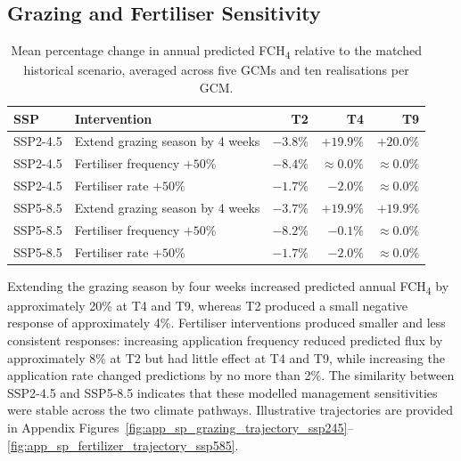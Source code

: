 \FloatBarrier

\subsection{Grazing and Fertiliser Sensitivity}

\begin{table}[h]
\centering
\small
\renewcommand{\arraystretch}{1.1}
\begin{tabular}{llrrr}
\toprule
SSP & Intervention & T2 & T4 & T9 \\
\midrule
SSP2-4.5 & Extend grazing season by 4 weeks & $-3.8\%$ & $+19.9\%$ & $+20.0\%$ \\
SSP2-4.5 & Fertiliser frequency $+50\%$ & $-8.4\%$ & $\approx 0.0\%$ & $\approx 0.0\%$ \\
SSP2-4.5 & Fertiliser rate $+50\%$ & $-1.7\%$ & $-2.0\%$ & $\approx 0.0\%$ \\
\midrule
SSP5-8.5 & Extend grazing season by 4 weeks & $-3.7\%$ & $+19.9\%$ & $+19.9\%$ \\
SSP5-8.5 & Fertiliser frequency $+50\%$ & $-8.2\%$ & $-0.1\%$ & $\approx 0.0\%$ \\
SSP5-8.5 & Fertiliser rate $+50\%$ & $-1.7\%$ & $-2.0\%$ & $\approx 0.0\%$ \\
\bottomrule
\end{tabular}
\caption{Mean percentage change in annual predicted FCH\textsubscript{4} relative to the matched
historical scenario, averaged across five GCMs and ten realisations per GCM.}
\label{tab:management_scenario_results}
\end{table}

  Extending the grazing season by four weeks increased predicted annual
  FCH\textsubscript{4} by approximately 20\% at T4 and T9, whereas T2 produced a
  small negative response of approximately 4\%. Fertiliser interventions produced
  smaller and less consistent responses: increasing application frequency reduced
  predicted flux by approximately 8\% at T2 but had little effect at T4 and T9,
  while increasing the application rate changed predictions by no more than 2\%.
  The similarity between SSP2-4.5 and SSP5-8.5 indicates that these modelled
  management sensitivities were stable across the two climate pathways.
  Illustrative trajectories are provided in Appendix
  Figures~\ref{fig:app_sp_grazing_trajectory_ssp245}--%
  \ref{fig:app_sp_fertilizer_trajectory_ssp585}.


